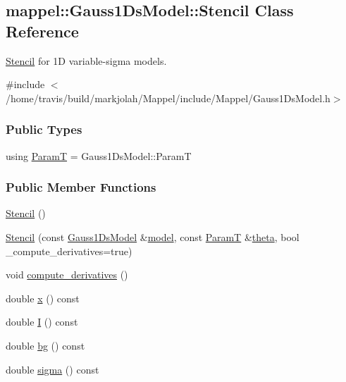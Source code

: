 \hypertarget{classmappel_1_1Gauss1DsModel_1_1Stencil}{}\subsection{mappel\+:\+:Gauss1\+Ds\+Model\+:\+:Stencil Class Reference}
\label{classmappel_1_1Gauss1DsModel_1_1Stencil}


\hyperlink{classmappel_1_1Gauss1DsModel_1_1Stencil}{Stencil} for 1D variable-\/sigma models.  




{\ttfamily \#include $<$/home/travis/build/markjolah/\+Mappel/include/\+Mappel/\+Gauss1\+Ds\+Model.\+h$>$}

\subsubsection*{Public Types}
\begin{DoxyCompactItemize}
\item 
using \hyperlink{classmappel_1_1Gauss1DsModel_1_1Stencil_adaba50464646fb95c5853b5c15365ed2}{ParamT} = Gauss1\+Ds\+Model\+::\+ParamT
\end{DoxyCompactItemize}
\subsubsection*{Public Member Functions}
\begin{DoxyCompactItemize}
\item 
\hyperlink{classmappel_1_1Gauss1DsModel_1_1Stencil_a7d151d646b8286c83a3c6e5b49b1a66d}{Stencil} ()
\item 
\hyperlink{classmappel_1_1Gauss1DsModel_1_1Stencil_ae4f12261a80d8ed1a2d3652c0e7b629b}{Stencil} (const \hyperlink{classmappel_1_1Gauss1DsModel}{Gauss1\+Ds\+Model} \&\hyperlink{classmappel_1_1Gauss1DsModel_1_1Stencil_aea5b9e51d1fc6471820598c321472bfe}{model}, const \hyperlink{classmappel_1_1Gauss1DsModel_1_1Stencil_adaba50464646fb95c5853b5c15365ed2}{ParamT} \&\hyperlink{classmappel_1_1Gauss1DsModel_1_1Stencil_ab1acb6728b521c0ba62d06bc9a92ae79}{theta}, bool \+\_\+compute\+\_\+derivatives=true)
\item 
void \hyperlink{classmappel_1_1Gauss1DsModel_1_1Stencil_a9e8b6059b84e28bea0ba3496bc95e7ce}{compute\+\_\+derivatives} ()
\item 
double \hyperlink{classmappel_1_1Gauss1DsModel_1_1Stencil_a58c751f2db27f365454fda0db3bfcd1a}{x} () const 
\item 
double \hyperlink{classmappel_1_1Gauss1DsModel_1_1Stencil_a29ce270778228bbf34c3bb995f7fa3b6}{I} () const 
\item 
double \hyperlink{classmappel_1_1Gauss1DsModel_1_1Stencil_a02181effe22edf10cdd2dea3bf766a1b}{bg} () const 
\item 
double \hyperlink{classmappel_1_1Gauss1DsModel_1_1Stencil_a91366bc87b44318c0ded04ac99760c27}{sigma} () const 
\end{DoxyCompactItemize}
